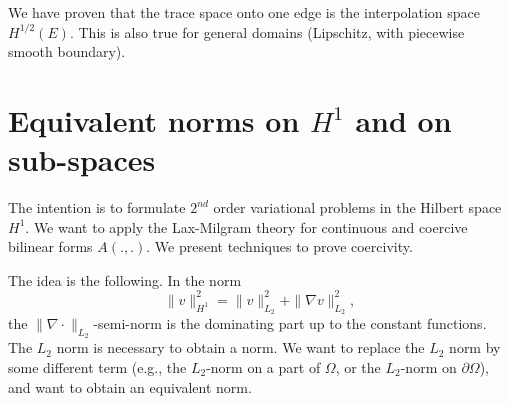 We have proven that the trace space onto one edge is the interpolation 
space $H^{1/2}(E)$. This is also true for general domains (Lipschitz, with piecewise smooth boundary). 


\section{Equivalent norms on $H^1$ and on sub-spaces}

The intention is to formulate $2^{nd}$ order variational problems in the 
Hilbert space $H^1$. We want to apply the Lax-Milgram theory for continuous
and coercive bilinear forms $A(.,.)$. We present techniques to prove
coercivity.

The idea is the following. In the norm
$$
\| v \|_{H^1}^2 = \| v \|_{L_2}^2 + \| \nabla v \|_{L_2}^2,
$$
%
the $\| \nabla \cdot \|_{L_2}$-semi-norm is the dominating part up to
the constant functions. The $L_2$ norm is necessary to obtain a
norm. We want to replace the $L_2$ norm by some different term (e.g.,
the $L_2$-norm on a part of $\Omega$, or the $L_2$-norm on $\partial
\Omega$), and want to obtain an equivalent norm.


